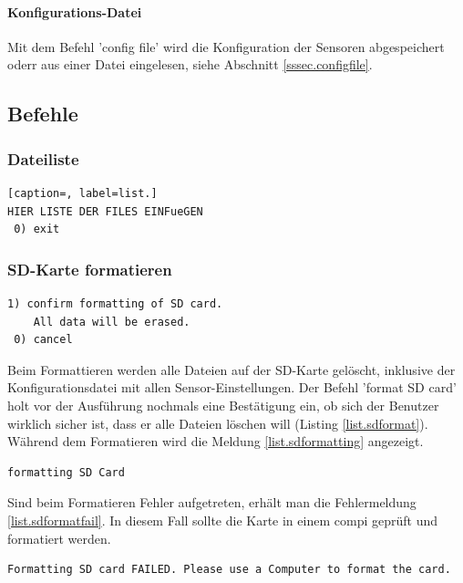 \paragraph{Konfigurations-Datei} Mit dem Befehl 'config file' wird die Konfiguration der Sensoren abgespeichert oderr aus einer Datei eingelesen, siehe Abschnitt \ref{sssec.configfile}.

\subsection{Befehle}\label{ssec.befehle}
\subsubsection{Dateiliste}\label{sssec.listfiles}
\begin{lstlisting}[caption=, label=list.]
HIER LISTE DER FILES EINFueGEN
 0) exit
\end{lstlisting}


\subsubsection{SD-Karte formatieren}\label{sssec.sdformat}
\begin{lstlisting}[caption=Untermenü SD-Karte formatieren, label=list.sdformat]
 1) confirm formatting of SD card.
    All data will be erased.
 0) cancel
\end{lstlisting}

Beim Formattieren werden alle Dateien auf der SD-Karte gelöscht, inklusive der Konfigurationsdatei mit allen Sensor-Einstellungen. Der Befehl 'format SD card' holt vor der Ausführung nochmals eine Bestätigung ein, ob sich der Benutzer wirklich sicher ist, dass er alle Dateien löschen will (Listing \ref{list.sdformat}). Während dem Formatieren wird die Meldung \ref{list.sdformatting} angezeigt.

\begin{lstlisting}[caption=Statusmeldung SD formatieren, label=list.sdformatting]
formatting SD Card
\end{lstlisting}

Sind beim Formatieren Fehler aufgetreten, erhält man die Fehlermeldung \ref{list.sdformatfail}. In diesem Fall sollte die Karte in einem \gls{compi} geprüft und formatiert werden.

\begin{lstlisting}[caption=Fehlermeldung SD formatieren, label=list.sdformatfail]
Formatting SD card FAILED. Please use a Computer to format the card.
\end{lstlisting}

